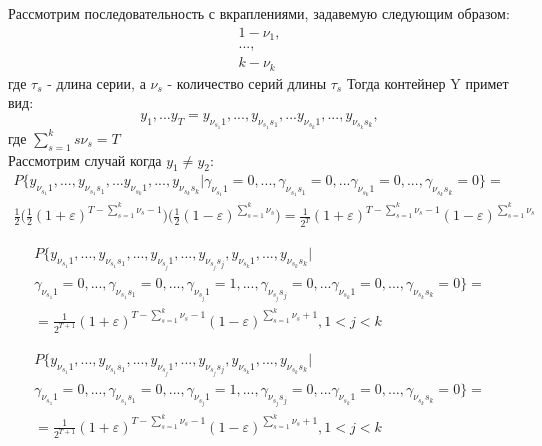 \documentclass[a4paper,12pt]{article}
\theoremstyle{plain}
\begin{document}
	Рассмотрим последовательность с вкраплениями, задавемую следующим образом:
	\begin{gather*}
	1 - \nu_1,\\
	...,\\
	k - \nu_k 
	\end{gather*}
где $\tau_s$ - длина серии, а $\nu_s$ - количество серий длины $\tau_s$
Тогда контейнер Y примет вид:
\begin{equation}y_1,... y_T = y_{\nu_{s_1}1},..., y_{\nu_{s_1}s_1}, ...y_{\nu_{s_k}1},...,y_{\nu_{s_k}s_k},
\end{equation}
 где $\sum\limits_{s=1}^{k}s\nu_s=T$\\
 Рассмотрим случай когда $y_1\neq y_2$:
 \begin{gather*}
 P\{y_{\nu_{s_1}1},..., y_{\nu_{s_1}s_1}, ...y_{\nu_{s_k}1},...,y_{\nu_{s_k}s_k}|\gamma_{\nu_{s_1}1}=0,..., \gamma_{\nu_{s_1}s_1}=0, ...\gamma_{\nu_{s_k}1}=0,...,\gamma_{\nu_{s_k}s_k}=0\} =\\ \frac{1}{2}\biggl(\frac{1}{2}(1+\varepsilon)^{T-\sum\limits_{s=1}^{k}\nu_s-1}\biggl)\biggl(\frac{1}{2}(1-\varepsilon)^{\sum\limits_{s=1}^{k}\nu_s}\biggl) =\frac{1}{2^T}(1+\varepsilon)^{T-\sum\limits_{s=1}^{k}\nu_s-1} (1-\varepsilon)^{\sum\limits_{s=1}^{k}\nu_s}
\end{gather*} 


 \begin{gather*}
 P\{y_{\nu_{s_1}1},..., y_{\nu_{s_1}s_1}, ...,y_{\nu_{s_j}1},...,y_{\nu_{s_j}s_j}, y_{\nu_{s_k}1},...,y_{\nu_{s_k}s_k}|\\ \gamma_{\nu_{s_1}1}=0, ..., \gamma_{\nu_{s_1}s_1}=0,...,\gamma_{\nu_{s_j}1}=1,...,\gamma_{\nu_{s_j}s_j}=0,  ...\gamma_{\nu_{s_k}1}=0,...,\gamma_{\nu_{s_k}s_k}=0\} =\\  =\frac{1}{2^{T+1}}(1+\varepsilon)^{T-\sum\limits_{s=1}^{k}\nu_s-1} (1-\varepsilon)^{\sum\limits_{s=1}^{k}\nu_s+1}, 1<j<k
 \end{gather*} 
 
 \begin{gather*}
 P\{y_{\nu_{s_1}1},..., y_{\nu_{s_1}s_1}, ...,y_{\nu_{s_j}1},...,y_{\nu_{s_j}s_j}, y_{\nu_{s_k}1},...,y_{\nu_{s_k}s_k}|\\ \gamma_{\nu_{s_1}1}=0, ..., \gamma_{\nu_{s_1}s_1}=0,...,\gamma_{\nu_{s_j}1}=1,...,\gamma_{\nu_{s_j}s_j}=0,  ...\gamma_{\nu_{s_k}1}=0,...,\gamma_{\nu_{s_k}s_k}=0\} =\\  =\frac{1}{2^{T+1}}(1+\varepsilon)^{T-\sum\limits_{s=1}^{k}\nu_s-1} (1-\varepsilon)^{\sum\limits_{s=1}^{k}\nu_s+1}, 1<j<k
 \end{gather*} 
 
\end{document}
